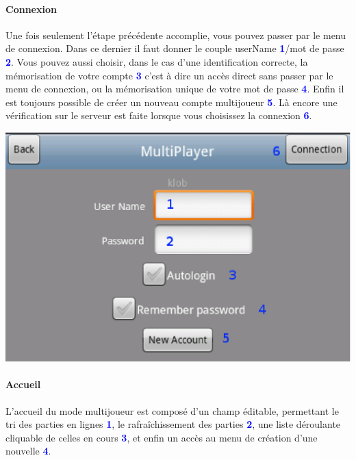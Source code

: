 	\paragraph{Connexion}
		Une fois seulement l'étape précédente accomplie, vous pouvez passer par le
		menu de connexion. Dans ce dernier il faut donner le couple
		userName \textcolor{blue}{\textbf{1}}/mot de passe
		\textcolor{blue}{\textbf{2}}. Vous pouvez aussi choisir, dans le cas d'une
		identification correcte, la mémorisation de votre compte
		\textcolor{blue}{\textbf{3}} c'est à dire un accès direct sans passer par le
		menu de connexion, ou la mémorisation unique de votre mot de passe
		\textcolor{blue}{\textbf{4}}. Enfin il est toujours possible de créer un
		nouveau compte multijoueur \textcolor{blue}{\textbf{5}}. Là encore une
		vérification sur le serveur est faite lorsque vous choisissez la connexion
		\textcolor{blue}{\textbf{6}}.
		
		\begin{center}
			\includegraphics[scale=0.7]{Manuel/Img/17.eps}
		\end{center}
	
	\paragraph{Accueil}
	L'accueil du mode multijoueur est composé d'un champ éditable, permettant le
	tri des parties en lignes \textcolor{blue}{\textbf{1}}, le rafraîchissement des
	parties \textcolor{blue}{\textbf{2}}, une liste déroulante cliquable de celles
	en cours \textcolor{blue}{\textbf{3}}, et enfin un accès au menu de création
	d'une nouvelle \textcolor{blue}{\textbf{4}}.
	
